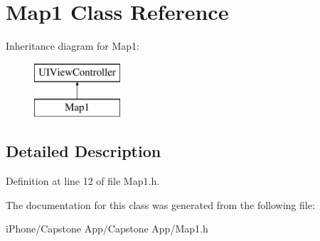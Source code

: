 \hypertarget{interface_map1}{\section{Map1 Class Reference}
\label{interface_map1}
}
Inheritance diagram for Map1\-:\begin{figure}[H]
\begin{center}
\leavevmode
\includegraphics[height=2.000000cm]{interface_map1}
\end{center}
\end{figure}


\subsection{Detailed Description}


Definition at line 12 of file Map1.\-h.



The documentation for this class was generated from the following file\-:\begin{DoxyCompactItemize}
\item 
i\-Phone/\-Capstone App/\-Capstone App/Map1.\-h\end{DoxyCompactItemize}
